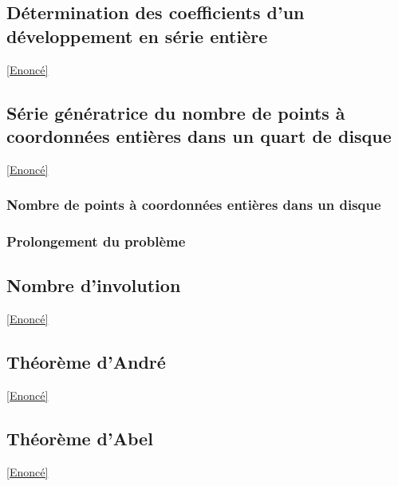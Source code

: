 \documentclass{book}
\begin{document}
	\subsection{Détermination des coefficients d'un développement en série entière}
	\label{sec:determination-des-coefficients-dun-developpement-en-serie-entiere}
	\textcolor{blue}{\hyperref[Détermination des coefficients d'un développement en série entière]{[Enoncé]}}\\
	
	\subsection{Série génératrice du nombre de points à coordonnées entières dans un quart de disque}
	\label{sec:serie-generatrice-du-nombre-de-points-a-coordonnees-entieres-dans-un-quart-de-disque}
	\textcolor{blue}{\hyperref[Série génératrice du nombre de points à coordonnées entières dans un quart de disque]{[Enoncé]}}\\
	
	\subsubsection{Nombre de points à coordonnées entières dans un disque}
	
	\subsubsection{Prolongement du problème}
	
	\subsection{Nombre d'involution}
	\label{sec:nombre-dinvolution}
	\textcolor{blue}{\hyperref[Nombre d'involution]{[Enoncé]}}\\
	
	\subsection{Théorème d'André}
	\label{Théorème d'André correction}
	\textcolor{blue}{\hyperref[Théorème d'André]{[Enoncé]}}\\
	
	\subsection{Théorème d'Abel}
	\label{sec:theoreme-dabel}
	\textcolor{blue}{\hyperref[Théorème d'Abel]{[Enoncé]}}\\
	
\end{document}
